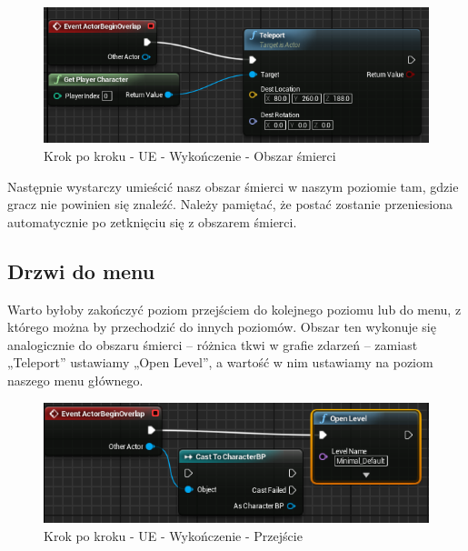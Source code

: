 \documentclass[openright]{xmgr}
\begin{document}
\begin{figure}[!htb]
    \begin{center}
    \includegraphics[scale=0.5]{Screeny/UeKrokPoKroku/LevelGraph}
    \end{center}
    \caption{Krok po kroku - UE - Wykończenie - Obszar śmierci }
\end{figure}

Następnie wystarczy umieścić nasz obszar śmierci w naszym poziomie tam, gdzie gracz nie powinien się znaleźć. Należy pamiętać, że postać zostanie przeniesiona automatycznie po zetknięciu się z obszarem śmierci.

\subsection{Drzwi do menu}

Warto byłoby zakończyć poziom przejściem do kolejnego poziomu lub do menu, z którego można by przechodzić do innych poziomów. Obszar ten wykonuje się analogicznie do obszaru śmierci – różnica tkwi w grafie zdarzeń – zamiast „Teleport” ustawiamy „Open Level”, a wartość w nim ustawiamy na poziom naszego menu głównego.

\begin{figure}[!htb]
    \begin{center}
    \includegraphics[scale=0.5]{Screeny/UeKrokPoKroku/Door}
    \end{center}
    \caption{Krok po kroku - UE - Wykończenie - Przejście}
\end{figure}
\end{document}
